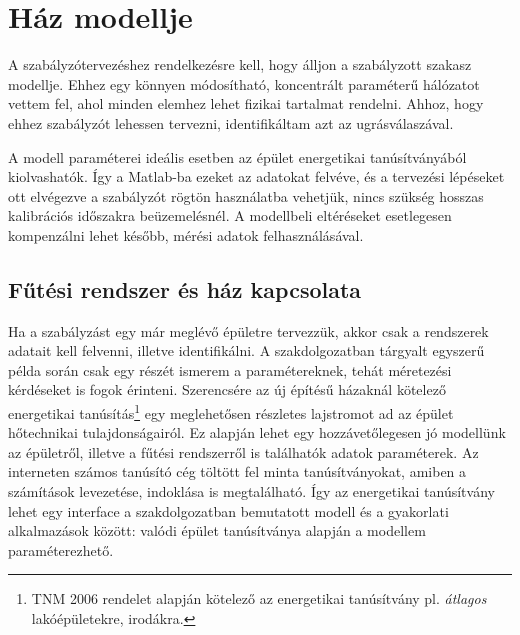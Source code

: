 \chapter{Ház modellje}


A szabályzótervezéshez rendelkezésre kell, hogy álljon a szabályzott szakasz modellje. Ehhez egy könnyen módosítható, koncentrált paraméterű hálózatot vettem fel,
ahol minden elemhez lehet fizikai tartalmat rendelni. Ahhoz, hogy ehhez szabályzót lehessen tervezni, identifikáltam azt az ugrásválaszával. %

A modell paraméterei ideális esetben az épület energetikai tanúsítványából kiolvashatók. Így a Matlab-ba ezeket az adatokat felvéve, és a tervezési lépéseket ott elvégezve a szabályzót rögtön használatba vehetjük, nincs szükség hosszas kalibrációs időszakra beüzemelésnél. A modellbeli eltéréseket esetlegesen kompenzálni lehet később, mérési adatok felhasználásával.%

\section{Fűtési rendszer és ház kapcsolata}

Ha a szabályzást egy már meglévő épületre tervezzük, akkor csak a rendszerek adatait kell felvenni, illetve identifikálni. A szakdolgozatban tárgyalt egyszerű példa során csak egy részét ismerem a paramétereknek, tehát méretezési kérdéseket is fogok érinteni.  Szerencsére az új építésű házaknál kötelező energetikai tanúsítás\footnote{TNM 2006 rendelet alapján kötelező az energetikai tanúsítvány pl. \textit{átlagos} lakóépületekre, irodákra.} egy meglehetősen részletes lajstromot ad az épület hőtechnikai tulajdonságairól. Ez alapján lehet egy hozzávetőlegesen jó modellünk az épületről, illetve a fűtési rendszerről is találhatók adatok paraméterek. Az interneten számos tanúsító cég töltött fel minta tanúsítványokat, amiben a számítások levezetése, indoklása is megtalálható. Így az energetikai tanúsítvány lehet egy interface a szakdolgozatban bemutatott modell és a gyakorlati alkalmazások között: valódi épület tanúsítványa alapján a modellem paraméterezhető.


